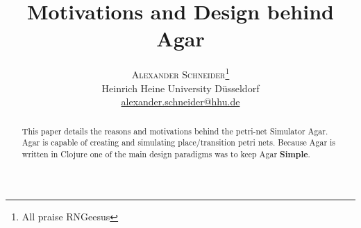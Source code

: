 \documentclass[twoside]{article}
\title{\vspace{-15mm}\fontsize{24pt}{10pt}\selectfont\textbf{Motivations and Design behind Agar}} %
\author{
\large
\textsc{Alexander Schneider}\thanks{All praise RNGeesus}\\[2mm] %
\normalsize Heinrich Heine University D\"usseldorf \\ %
\normalsize \href{mailto:alexander.schneider@hhu.de}{alexander.schneider@hhu.de} %
\vspace{-5mm}
}
\date{}
\begin{document}
\maketitle %

\thispagestyle{fancy} %


\begin{abstract}

\noindent This paper details the reasons and motivations behind the petri-net Simulator Agar.\\
Agar is capable of creating and simulating place/transition petri nets. Because Agar is written
in Clojure one of the main design paradigms was to keep Agar \textbf{Simple}.  

\end{abstract}

\end{document}

